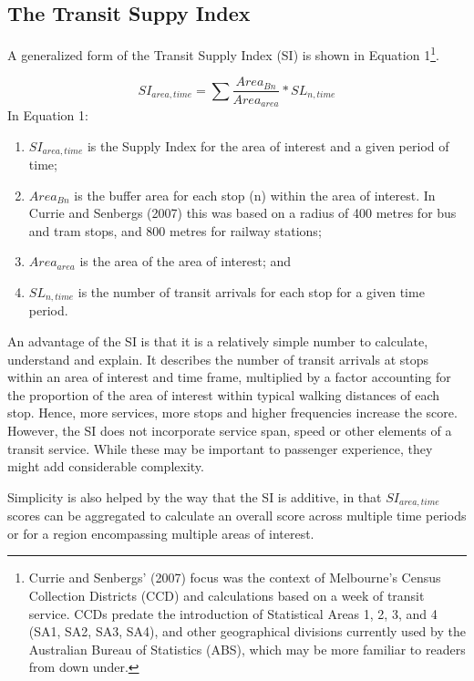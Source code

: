 \documentclass[preprint, 3p,
authoryear]{elsarticle} %
\providecommand{\tightlist}{%
  \setlength{\itemsep}{0pt}\setlength{\parskip}{0pt}}
\begin{document}
\hypertarget{the-transit-suppy-index}{%
\subsection{The Transit Suppy Index}\label{the-transit-suppy-index}}

A generalized form of the Transit Supply Index (SI) is shown in Equation
1\footnote{ Currie and Senbergs' (2007) focus was the context of
  Melbourne's Census Collection Districts (CCD) and calculations based
  on a week of transit service. CCDs predate the introduction of
  Statistical Areas 1, 2, 3, and 4 (SA1, SA2, SA3, SA4), and other
  geographical divisions currently used by the Australian Bureau of
  Statistics (ABS), which may be more familiar to readers from down
  under.}.

\[SI_{area, time} = \sum{\frac{Area_{Bn}}{Area_{area}}*SL_{n, time}}\]
In Equation 1:

\begin{enumerate}
\def\labelenumi{(\arabic{enumi})}
\tightlist
\item
  \(SI_{area, time}\) is the Supply Index for the area of interest and a
  given period of time;
\item
  \(Area_{Bn}\) is the buffer area for each stop (n) within the area of
  interest. In Currie and Senbergs (2007) this was based on a radius of
  400 metres for bus and tram stops, and 800 metres for railway
  stations;
\item
  \(Area_{area}\) is the area of the area of interest; and
\item
  \(SL_{n,time}\) is the number of transit arrivals for each stop for a
  given time period.
\end{enumerate}

An advantage of the SI is that it is a relatively simple number to
calculate, understand and explain. It describes the number of transit
arrivals at stops within an area of interest and time frame, multiplied
by a factor accounting for the proportion of the area of interest within
typical walking distances of each stop. Hence, more services, more stops
and higher frequencies increase the score. However, the SI does not
incorporate service span, speed or other elements of a transit service.
While these may be important to passenger experience, they might add
considerable complexity.

Simplicity is also helped by the way that the SI is additive, in that
\(SI_{area, time}\) scores can be aggregated to calculate an overall
score across multiple time periods or for a region encompassing multiple
areas of interest.
\end{document}
